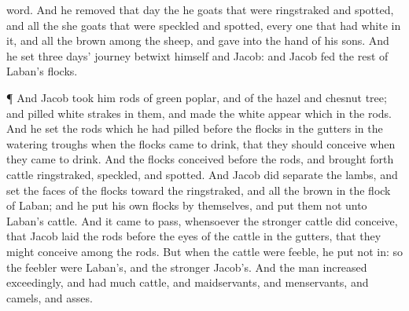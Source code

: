 {word.
And he
removed that
day the he
goats that were
ringstraked and
spotted, and all the she
goats that were
speckled and
spotted,
{} every one that had
{}
white in it, and all the
brown among the
sheep, and
gave
{} into the
hand of his
sons.
And he
set
three
days’
journey betwixt himself and
Jacob: and
Jacob
fed the
rest of
Laban’s
flocks.
\par }{\PP {}¶ And
Jacob
took him
rods of
green
poplar, and of the
hazel and chesnut
tree; and
pilled
white
strakes in them, and made the
white
appear which
{} in the
rods.
And he
set the
rods which he had
pilled
before the
flocks in the
gutters in the
watering
troughs when the
flocks
came to
drink, that they should
conceive when they
came to
drink.
And the
flocks
conceived before the
rods, and brought
forth
cattle
ringstraked,
speckled, and
spotted.
And
Jacob did
separate the
lambs, and
set the
faces of the
flocks
toward the
ringstraked, and all the
brown in the
flock of
Laban; and he
put his own
flocks by themselves, and
put them not unto
Laban’s
cattle.
And it came to pass, whensoever the
stronger
cattle did
conceive, that
Jacob
laid the
rods before the
eyes of the
cattle in the
gutters, that they might
conceive among the
rods.
But when the
cattle were
feeble, he put
{} not
in: so the
feebler were
Laban’s, and the
stronger
Jacob’s.
And the
man
increased
exceedingly, and had
much
cattle, and
maidservants, and
menservants, and
camels, and
asses.

}
